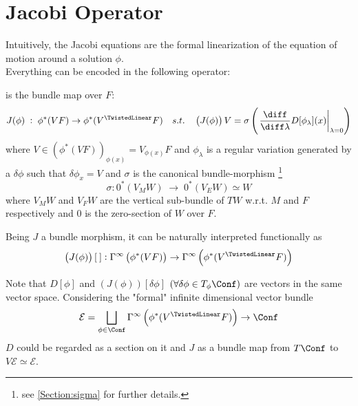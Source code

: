 \documentclass[a4paper,12pt,fleqn]{scrartcl}  %
\begin{document}
\section{Jacobi Operator}\label{Sec:JacobiOperator}
Intuitively, the Jacobi equations are the formal linearization of the equation of motion around a solution $\phi$.\\
Everything can be encoded in the following operator:
%
	\begin{definition}\label{Def:JacobiOp} is the bundle map over $F$:
		\begin{displaymath}
			J(\phi) \; : \; \phi^\ast(VF) \rightarrow	\phi^\ast(V^\TwistedLinear F) 
			\quad s.t. \quad  \left(J(\phi)\right) V
			= \sigma \left( \left.\dfrac{\diff}{\diff \lambda} D [\phi_\lambda](x) \right\rvert_{\lambda=0} \right)
		\end{displaymath}
		where $V\in (\phi^\ast(VF))_{\phi(x)} = V_{\phi(x)}F$ and $\phi_\lambda$ is a regular variation generated by a $\delta\phi$ such that $\delta\phi_x = V$ and
		$\sigma$ is the canonical bundle-morphism \footnote{see \ref{Section:sigma} for further details.}
		\begin{displaymath}
			\sigma:  0^\ast \left( V_M W \right)  \; \rightarrow \;  0^\ast \left(V_E W \right) \simeq W
		\end{displaymath}
		 where $V_M W$ and $V_F W$ are the vertical sub-bundle of $T W$ w.r.t. $M$ and $F$ respectively 
		 and $0$ is the zero-section of $W$ over $F$.
	\end{definition}
	\begin{remark}
		Being $J$ a bundle morphism, it can be naturally interpreted functionally as
		\begin{displaymath}
			\left(J(\phi)\right) [\: ] : 
			\Gamma^\infty\left(\phi^\ast(VF)\right) \rightarrow	
			\Gamma^\infty \left( 
			\phi^\ast(V^\TwistedLinear F)
			\right)
		\end{displaymath}
	\end{remark}
%
	Note that $D[ \phi]$  and $ \left(J(\phi)\right) [ \delta \phi ]$  $(\forall \delta\phi \in T_\phi\Conf)$ are vectors in the same vector space.
	Considering the "formal" infinite dimensional vector bundle 
	\begin{displaymath}
		\mathcal{E} =\bigsqcup_{\phi \in \Conf} 
			\Gamma^\infty \left( 
				\phi^\ast(V^\TwistedLinear F)
			\right)
			\rightarrow \Conf
	\end{displaymath}
	$D$ could be regarded as a section on it and $J$ as a bundle map from $T\Conf$ to $V\mathcal{E}\simeq \mathcal{E}$.
	\begin{center}
	  	
	\end{center}
\end{document}
